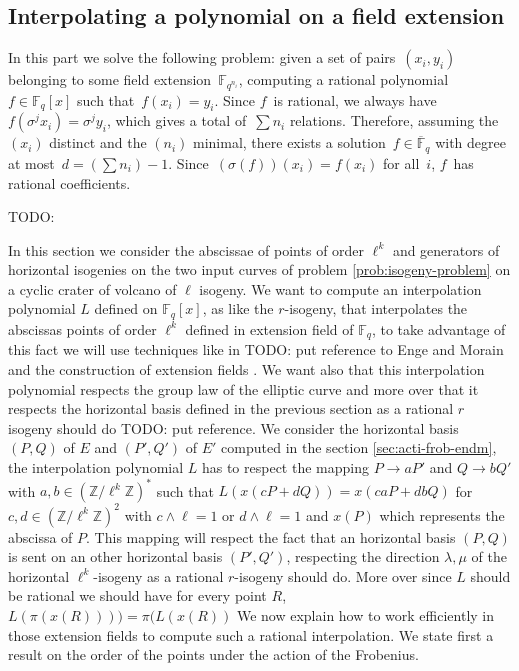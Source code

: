 \documentclass{lms}
\newcommand{\todo}[1]{{\color{red}TODO: #1}}
\newcommand{\F}{\mathbb{F}}
\begin{document}
\subsection{Interpolating a polynomial on a field extension}

In this part we solve the following problem:
given a set of pairs~$(x_i, y_i)$ belonging to
some field extension~$\F_{q^{n_i}}$,
computing a rational polynomial~$f ∈ \F_q[x]$ such that~$f(x_i) = y_i$.
Since $f$~is rational, we always have~$f(σ^j x_i) = σ^j y_i$,
which gives a total of~$∑ n_i$ relations.
Therefore, assuming the $(x_i)$ distinct and the $(n_i)$ minimal,
there exists a solution~$f ∈ \overline{\F}_{q}$
with degree at most~$d = (∑ n_i) - 1$.
Since~$(σ(f)) (x_i) = f(x_i)$ for all~$i$, $f$~has rational coefficients.

\todo{\vrule height 1pt width 10cm}

In this section we consider the abscissae of points of order $\ell^k$ and generators of horizontal isogenies on the two input curves of problem \ref{prob:isogeny-problem} on a cyclic crater of volcano of $\ell$ isogeny. We want to compute an interpolation polynomial $L$ defined on $\mathbb{F}_q[x]$, as like the $r$-isogeny, that interpolates the abscissas points of order $\ell^k$ defined in extension field of $\mathbb{F}_q$, to take advantage of this fact we will use techniques like in \todo{put reference to Enge and Morain} and the construction of extension fields \cite{DoSc12} \cite{DeDoSc13} . We want also that this interpolation polynomial respects the group law of the elliptic curve and more over that it respects the horizontal basis defined in the previous section as a rational $r$ isogeny should do \todo{put reference}.
\newline
 We consider the horizontal basis $(P,Q)$ of $E$ and $(P',Q')$ of $E'$ computed in the section \ref{sec:acti-frob-endm}, the interpolation polynomial $L$ has to respect the mapping $P \rightarrow aP'$ and $Q \rightarrow bQ'$ with $a,b \in \left(\mathbb{Z}/\ell^k \mathbb{Z} \right)^*$ such that $L(x(cP+dQ))=x(caP+dbQ)$ for $c,d \in (\mathbb{Z}/\ell^k\mathbb{Z})^2$ with $c\wedge \ell=1$ or $d \wedge \ell =1$ and $x(P)$ which represents the abscissa of $P$. This mapping will respect the fact that an horizontal basis $(P,Q)$ is sent on an other horizontal basis $(P',Q')$, respecting the direction $\lambda, \mu$ of the horizontal $\ell^k$-isogeny as a rational $r$-isogeny should do. More over since $L$ should be rational we should have for every point $R$, $L(\pi(x(R))))=\pi(L(x(R))$ 
\newline
We now explain how to work efficiently in those extension fields to compute such a rational interpolation. 
We state first a result on the order of the points under the action of the Frobenius.
\end{document}
